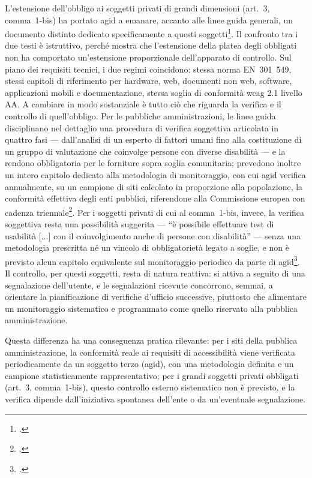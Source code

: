 L'estensione dell'obbligo ai soggetti privati di grandi dimensioni (art.~3, comma~1-bis) ha portato \gls{agid} a emanare, accanto alle linee guida generali, un documento distinto dedicato specificamente a questi soggetti\footcite{agid:lg-stanca-1bis}. Il confronto tra i due testi è istruttivo, perché mostra che l'estensione della platea degli obbligati non ha comportato un'estensione proporzionale dell'apparato di controllo. Sul piano dei requisiti tecnici, i due regimi coincidono: stessa norma EN~301~549, stessi capitoli di riferimento per hardware, web, documenti non web, software, applicazioni mobili e documentazione, stessa soglia di conformità \gls{wcag} 2.1 livello AA. A cambiare in modo sostanziale è tutto ciò che riguarda la verifica e il controllo di quell'obbligo. Per le pubbliche amministrazioni, le linee guida disciplinano nel dettaglio una procedura di verifica soggettiva articolata in quattro fasi --- dall'analisi di un esperto di fattori umani fino alla costituzione di un gruppo di valutazione che coinvolge persone con diverse disabilità --- e la rendono obbligatoria per le forniture sopra soglia comunitaria; prevedono inoltre un intero capitolo dedicato alla metodologia di monitoraggio, con cui \gls{agid} verifica annualmente, su un campione di siti calcolato in proporzione alla popolazione, la conformità effettiva degli enti pubblici, riferendone alla Commissione europea con cadenza triennale\footcite[cap.~3 e cap.~5]{agid:lg-stanca}. Per i soggetti privati di cui al comma~1-bis, invece, la verifica soggettiva resta una possibilità suggerita --- \enquote{è possibile effettuare test di usabilità [...] con il coinvolgimento anche di persone con disabilità} --- senza una metodologia prescritta né un vincolo di obbligatorietà legato a soglie, e non è previsto alcun capitolo equivalente sul monitoraggio periodico da parte di \gls{agid}\footcite[§~3.2.2]{agid:lg-stanca-1bis}. Il controllo, per questi soggetti, resta di natura reattiva: si attiva a seguito di una segnalazione dell'utente, e le segnalazioni ricevute concorrono, semmai, a orientare la pianificazione di verifiche d'ufficio successive, piuttosto che alimentare un monitoraggio sistematico e programmato come quello riservato alla pubblica amministrazione.

Questa differenza ha una conseguenza pratica rilevante: per i siti della pubblica amministrazione, la conformità reale ai requisiti di accessibilità viene verificata periodicamente da un soggetto terzo (\gls{agid}), con una metodologia definita e un campione statisticamente rappresentativo; per i grandi soggetti privati obbligati (art.~3, comma~1-bis), questo controllo esterno sistematico non è previsto, e la verifica dipende dall'iniziativa spontanea dell'ente o da un'eventuale segnalazione.

